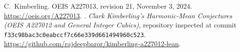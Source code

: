  C.~Kimberling. OEIS A227013, revision 21, November 3, 2024.
\url{https://oeis.org/A227013}.
 . \emph{Clark Kimberling's Harmonic-Mean Conjectures (OEIS A227012 and General Integer Cubics)},
repository inspected at commit \texttt{f33c98bac3c0eabccf7c66e339d661494960c523}.
\url{https://github.com/rajdeepbaror/kimberling-a227012-lean}.
